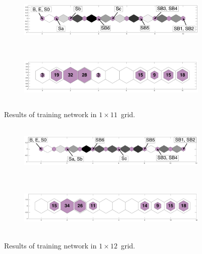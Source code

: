     \begin{figure}
        \begin{subfigure}[b]{0.5\textwidth}
            \centering
            \includegraphics[width=\textwidth,height=2.5cm]{../images0.01/1d/apps/dist_1_by_11.png}
        \end{subfigure}
        \hfill
        \begin{subfigure}[b]{0.5\textwidth}
             \includegraphics[width=\textwidth,height=2.5cm]{../images0.01/1d/apps/hit_v_1_by_11.png}
        \end{subfigure}
                \caption{Results of training network in $1\times11$~grid.}
         \label{fig: 1by11T}
    \end{figure}
    

    \begin{figure}
        \begin{subfigure}[b]{0.5\textwidth}
            \centering
            \includegraphics[width=\textwidth,height=2.5cm]{../images0.01/1d/apps/dist_1_by_12.png}
        \end{subfigure}
        \hfill
        \begin{subfigure}[b]{0.5\textwidth}
             \includegraphics[width=\textwidth,height=2.5cm]{../images0.01/1d/apps/hit_v_1_by_12.png}
        \end{subfigure}
                \caption{Results of training network in $1\times12$~grid.}
         \label{fig: 1by12T}
    \end{figure}

